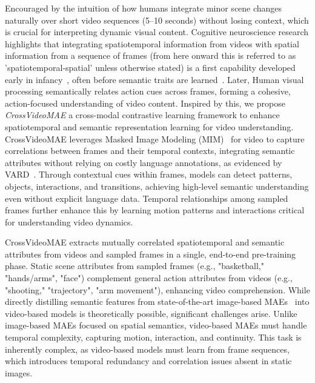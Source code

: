 Encouraged by the intuition of how humans integrate minor scene changes naturally over short video sequences (5–10 seconds) without losing context, which is crucial for interpreting dynamic visual content. Cognitive neuroscience research highlights that integrating spatiotemporal information from videos with spatial information from a sequence of frames (from here onward this is referred to as 'spatiotemporal-spatial' unless otherwise stated) is a first capability developed early in infancy~\cite{richards2003development,van1996spatiotemporal}, often before semantic traits are learned~\cite{henderson2003human}. Later, Human visual processing semantically relates action cues across frames, forming a cohesive, action-focused understanding of video content. Inspired by this, we propose \textit{CrossVideoMAE} a cross-modal contrastive learning framework to enhance spatiotemporal and semantic representation learning for video understanding. CrossVideoMAE leverages Masked Image Modeling (MIM)~\cite{bao2022beit, he2022masked} for video to capture correlations between frames and their temporal contexts, integrating semantic attributes without relying on costly language annotations, as evidenced by VARD~\cite{lin2023self}. Through contextual cues within frames, models can detect patterns, objects, interactions, and transitions, achieving high-level semantic understanding even without explicit language data. Temporal relationships among sampled frames further enhance this by learning motion patterns and interactions critical for understanding video dynamics.

CrossVideoMAE extracts mutually correlated spatiotemporal and semantic attributes from videos and sampled frames in a single, end-to-end pre-training phase. Static scene attributes from sampled frames (e.g., "basketball," "hands/arms", "face") complement general action attributes from videos (e.g., "shooting," "trajectory", "arm movement"), enhancing video comprehension. While directly distilling semantic features from state-of-the-art image-based MAEs~\cite{he2022masked, li2022semmae} into video-based models is theoretically possible, significant challenges arise. Unlike image-based MAEs focused on spatial semantics, video-based MAEs must handle temporal complexity, capturing motion, interaction, and continuity. This task is inherently complex, as video-based models must learn from frame sequences, which introduces temporal redundancy and correlation issues absent in static images.

